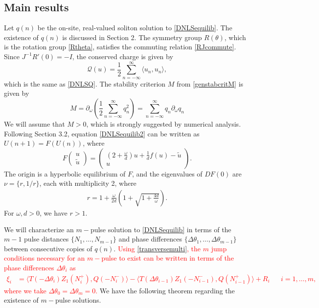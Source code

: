 \documentclass[12pt]{elsarticle}
\newcommand{\revised}[1]{ \textcolor{red}{#1} }
\begin{document}
\subsection{Main results}

Let $q(n)$ be the on-site, real-valued soliton solution to \cref{DNLSequilib}. The existence of $q(n)$ is discussed in Section 2. The symmetry group $R(\theta)$, which is the rotation group \eqref{Rtheta}, satisfies the commuting relation \eqref{RJcommute}. Since $J^{-1}R'(0) = -I$, the conserved charge is given by 
\begin{equation}\label{DNLSQ2}
\mathcal{Q}(u) = \frac{1}{2} \sum_{n = -\infty}^\infty 
\langle u_n, u_n \rangle,
\end{equation}
which is the same as \eqref{DNLSQ}. The stability criterion $M$ from \eqref{genstabcritM} is given by
\begin{equation}\label{DNLSM}
M = \partial_\omega \left( \frac{1}{2} \sum_{n=-\infty}^\infty q_n^2 \right) = \sum_{n=-\infty}^\infty q_n \partial_\omega q_n
\end{equation}
We will assume that $M > 0$, which is strongly suggested by numerical analysis. Following Section 3.2, equation \eqref{DNLSequilib2} can be written as $U(n+1) = F(U(n))$, where
\begin{equation}\label{DNLSF}
F\begin{pmatrix}u \\ \tilde{u} \end{pmatrix} =
\begin{pmatrix}
\left( 2 + \frac{\omega}{d} \right)u + \frac{1}{d}f(u) - \tilde{u} \\
u
\end{pmatrix}.
\end{equation}
The origin is a hyperbolic equilibrium of $F$, and the eigenvalues of $DF(0)$ are $\nu = \{r, 1/r\}$, each with multiplicity 2, where
\begin{align}\label{eigr}
r = 1 + \frac{\omega}{2 d} \left( 1 + \sqrt{1 + \frac{4 d}{\omega}} \right).
\end{align}
For $\omega, d > 0$, we have $r > 1$. 

We will characterize an $m-$pulse solution to \cref{DNLSequilib} in terms of the $m-1$ pulse distances $\{ N_1, \dots, N_{m-1} \}$ and phase differences $\{ \Delta\theta_1, \dots, \Delta\theta_{m-1} \}$ between consecutive copies of $q(n)$. \revised{Using \cref{transversemulti}, the $m$ jump conditions necessary for an $m-$pulse to exist can be written in terms of the phase differences $\Delta \theta_i$ as
\begin{align}\label{jumpDNLS1}
\xi_i &= \langle T(-\Delta \theta_i) Z_1(N_i^+), Q(-N_i^-) \rangle
- \langle T(\Delta \theta_{i-1}) Z_1(-N_{i-1}^-), Q(N_{i-1}^+) \rangle + R_i && i = 1, \dots, m,
\end{align}
where we take $\Delta \theta_0 = \Delta \theta_m = 0$.} We have the following theorem regarding the existence of $m-$pulse solutions. 
\end{document}

